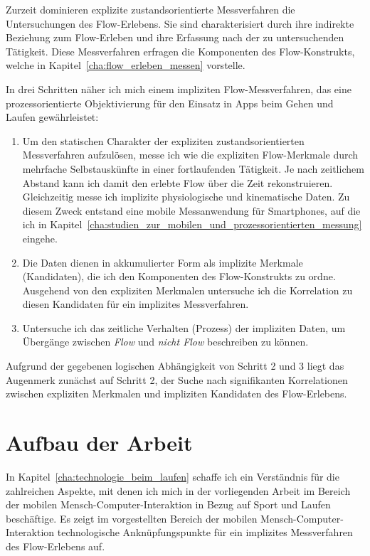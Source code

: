 Zurzeit dominieren explizite zustandsorientierte Messverfahren die Untersuchungen des Flow-Erlebens. Sie sind charakterisiert durch ihre indirekte Beziehung zum Flow-Erleben und ihre Erfassung nach der zu untersuchenden Tätigkeit. Diese Messverfahren erfragen die Komponenten des Flow-Konstrukts, welche in Kapitel~\ref{cha:flow_erleben_messen} vorstelle. 

In drei Schritten näher ich mich einem impliziten Flow-Messverfahren, das eine prozessorientierte Objektivierung für den Einsatz in Apps beim Gehen und Laufen gewährleistet: 
\begin{enumerate}
	\item Um den statischen Charakter der expliziten zustandsorientierten Messverfahren aufzulösen, messe ich wie \citet{Reinhardt2006, Schuler2009} die expliziten Flow-Merkmale durch mehrfache Selbstauskünfte in einer fortlaufenden Tätigkeit. Je nach zeitlichem Abstand kann ich damit den erlebte Flow über die Zeit rekonstruieren. Gleichzeitig messe ich implizite physiologische und kinematische Daten. Zu diesem Zweck entstand eine mobile Messanwendung für Smartphones, auf die ich in Kapitel~\ref{cha:studien_zur_mobilen_und_prozessorientierten_messung} eingehe.
	
	\item Die Daten dienen in akkumulierter Form als implizite Merkmale (Kandidaten), die ich den Komponenten des Flow-Konstrukts zu ordne. Ausgehend von den expliziten Merkmalen untersuche ich die Korrelation zu diesen Kandidaten für ein implizites Messverfahren.
	
	\item Untersuche ich das zeitliche Verhalten (Prozess) der impliziten Daten, um Übergänge zwischen \emph{Flow} und \emph{nicht Flow} beschreiben zu können. 
\end{enumerate}

Aufgrund der gegebenen logischen Abhängigkeit von Schritt 2 und 3 liegt das Augenmerk zunächst auf Schritt 2, der Suche nach signifikanten Korrelationen zwischen expliziten Merkmalen und impliziten Kandidaten des Flow-Erlebens. 

\section{Aufbau der Arbeit} 

\label{sec:aufbau_der_arbeit}

In Kapitel~\ref{cha:technologie_beim_laufen} schaffe ich ein Verständnis für die zahlreichen Aspekte, mit denen ich mich in der vorliegenden Arbeit im Bereich der mobilen Mensch-Computer-Interaktion in Bezug auf Sport und Laufen beschäftige. Es zeigt im vorgestellten Bereich der mobilen Mensch-Computer-Interaktion technologische Anknüpfungspunkte für ein implizites Messverfahren des Flow-Erlebens auf.

